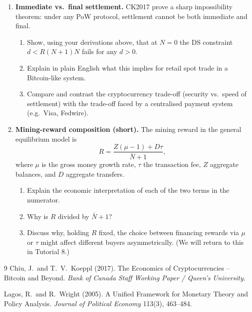 \documentclass[11pt]{article}
\begin{document}
\begin{enumerate}
\item \textbf{Immediate vs.\ final settlement.}
CK2017 prove a sharp impossibility theorem: under any PoW protocol, settlement cannot be
both immediate and final.
\begin{enumerate}
    \item Show, using your derivations above, that at $N=0$ the DS constraint
          $d < R(N+1)N$ fails for any $d>0$.
    \item Explain in plain English what this implies for retail spot trade in a Bitcoin-like
          system.
    \item Compare and contrast the cryptocurrency trade-off (security vs.\ speed of settlement)
          with the trade-off faced by a centralised payment system (e.g.\ Visa, Fedwire).
\end{enumerate}

\item \textbf{Mining-reward composition (short).}
The mining reward in the general equilibrium model is
\[
    R = \frac{Z(\mu - 1) + D\tau}{\bar N+1},
\]
where $\mu$ is the gross money growth rate, $\tau$ the transaction fee, $Z$ aggregate balances,
and $D$ aggregate transfers.
\begin{enumerate}
    \item Explain the economic interpretation of each of the two terms in the numerator.
    \item Why is $R$ divided by $\bar N+1$?
    \item Discuss why, holding $R$ fixed, the choice between financing rewards via $\mu$ or $\tau$
          might affect different buyers asymmetrically. (We will return to this in Tutorial 8.)
\end{enumerate}

\end{enumerate}

\begin{thebibliography}{9}
Chiu, J.\ and T.\ V.\ Koeppl (2017). The Economics of Cryptocurrencies -- Bitcoin and Beyond.
\textit{Bank of Canada Staff Working Paper / Queen's University}.

Lagos, R.\ and R.\ Wright (2005). A Unified Framework for Monetary Theory and Policy Analysis.
\textit{Journal of Political Economy} 113(3), 463--484.
\end{thebibliography}
\end{document}
